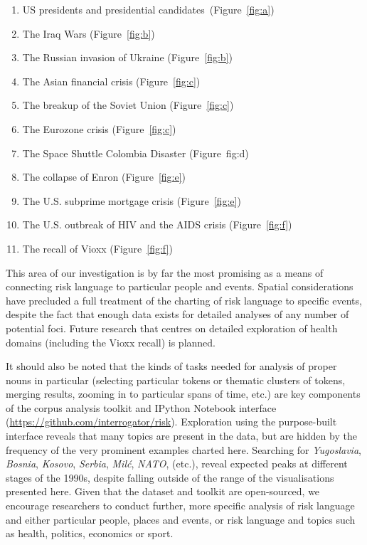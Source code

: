                 \begin{enumerate} \setlength\itemsep{0em}
                    \item US presidents and presidential candidates~(Figure~\ref{fig:a})
                    \item The Iraq Wars (Figure~\ref{fig:b})
                    \item The Russian invasion of Ukraine             (Figure~\ref{fig:b})       
                    \item The Asian financial crisis (Figure~\ref{fig:c})
                    \item The breakup of the Soviet Union (Figure~\ref{fig:c})
                    \item The Eurozone crisis (Figure~\ref{fig:c})
                    \item The Space Shuttle Colombia Disaster (Figure~{fig:d})
                    \item The collapse of Enron (Figure~\ref{fig:e})
                    \item The U.S. subprime mortgage crisis  (Figure~\ref{fig:e})
                    \item The U.S. outbreak of HIV and the AIDS crisis (Figure~\ref{fig:f})
                    \item The recall of Vioxx (Figure~\ref{fig:f})
                \end{enumerate}

                This area of our investigation is by far the most promising as a means of connecting risk language to particular people and events. Spatial considerations have precluded a full treatment of the charting of risk language to specific events, despite the fact that enough data exists for detailed analyses of any number of potential foci. Future research that centres on detailed exploration of health domains (including the Vioxx recall) is planned.

                It should also be noted that the kinds of tasks needed for analysis of proper nouns in particular (selecting particular tokens or thematic clusters of tokens, merging results, zooming in to particular spans of time, etc.) are key components of the corpus analysis toolkit and IPython Notebook interface (\url{https://github.com/interrogator/risk}). Exploration using the purpose-built interface reveals that many topics are present in the data, but are hidden by the frequency of the very prominent examples charted here. Searching for \emph{Yugoslavia}, \emph{Bosnia}, \emph{Kosovo}, \emph{Serbia}, \emph{Mil\uosevi\'c}, \emph{\textsc{NATO}}, (etc.), reveal expected peaks at different stages of the 1990s, despite falling outside of the range of the visualisations presented here. Given that the dataset and toolkit are open-sourced, we encourage researchers to conduct further, more specific analysis of risk language and either particular people, places and events, or risk language and topics such as health, politics, economics or sport.


%

